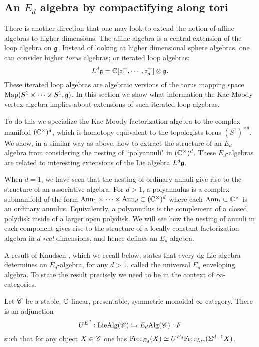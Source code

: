 
\subsection{An $E_d$ algebra by compactifying along tori} 

There is another direction that one may look to extend the notion of affine algebras to higher dimensions.
The affine algebra is a central extension of the loop algebra on $\mathfrak g$. 
Instead of looking at higher dimensional sphere algebras, one can consider higher {\em torus} algebras; or iterated loop algebras:
\[
L^d \mathfrak g = \mathbb C[z_1^{\pm}, \cdots, z_d^{\pm}] \otimes \mathfrak g .
\]
These iterated loop algebras are algebraic versions of the torus mapping space ${\rm Map}(S^1 \times \cdots \times S^1, \mathfrak g)$. 
In this section we show what information the Kac-Moody vertex algebra implies about extensions of such iterated loop algebras.

To do this we specialize the Kac-Moody factorization algebra to the complex manifold $(\mathbb C^\times)^d$, which is homotopy equivalent to the topologists torus $(S^1)^{\times d}$.  
We show, in a similar way as above, how to extract the structure of an $E_d$ algebra from considering the nesting of ``polyannuli" in $(\mathbb C^\times)^d$.
These $E_d$-algebras are related to interesting extensions of the Lie algebra $L^d \mathfrak g$.

When $d=1$, we have seen that the nesting of ordinary annuli give rise to the structure of an associative algebra. For $d > 1$, a polyannulus is a complex submanifold of the form ${\rm Ann}_1 \times \cdots \times {\rm Ann}_d \subset (\mathbb C^\times)^d$ where each ${\rm Ann}_i \subset \mathbb C^\times$ is an ordinary annulus. Equivalently, a polyannulus is the complement of a closed polydisk inside of a larger open polydisk. We will see how the nesting of annuli in each component gives rise to the structure of a locally constant factorization algebra in $d$ {\em real} dimensions, and hence defines an $E_d$ algebra. 

A result of Knudsen \cite{KnudsenEn}, which we recall below, states that every dg Lie algebra determines an $E_d$-algebra, for any $d>1$, called the universal $E_d$ enveloping algebra.
To state the result precisely we need to be in the context of $\infty$-categories.

\begin{thm} Let $\mathscr C$ be a stable, $\mathbb C$-linear, presentable, symmetric monoidal $\infty$-category.
There is an adjunction
\[
U^{E^d} : {\rm LieAlg}(\mathscr C) \leftrightarrows E_d{\rm Alg} (\mathscr C): F
\]
such that for any object $X \in \mathscr C$ one has ${\rm Free}_{E_d}(X) \simeq U^{E_d} {\rm Free}_{Lie}(\Sigma^{d-1} X)$. 
\end{thm}

